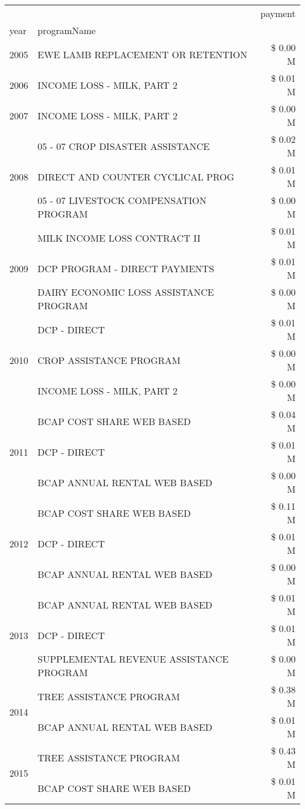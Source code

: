 \begin{tabular}{llr}
\toprule
 &  & payment \\
year & programName &  \\
\midrule
2005 & EWE LAMB REPLACEMENT OR RETENTION & \$ 0.00 M \\
\cline{1-3}
2006 & INCOME LOSS - MILK, PART 2 & \$ 0.01 M \\
\cline{1-3}
2007 & INCOME LOSS - MILK, PART 2 & \$ 0.00 M \\
\cline{1-3}
\multirow[t]{3}{*}{2008} & 05 - 07 CROP DISASTER ASSISTANCE & \$ 0.02 M \\
 & DIRECT AND COUNTER CYCLICAL PROG & \$ 0.01 M \\
 & 05 - 07 LIVESTOCK COMPENSATION PROGRAM & \$ 0.00 M \\
\cline{1-3}
\multirow[t]{3}{*}{2009} & MILK INCOME LOSS CONTRACT II & \$ 0.01 M \\
 & DCP PROGRAM - DIRECT PAYMENTS & \$ 0.01 M \\
 & DAIRY ECONOMIC LOSS ASSISTANCE PROGRAM & \$ 0.00 M \\
\cline{1-3}
\multirow[t]{3}{*}{2010} & DCP - DIRECT & \$ 0.01 M \\
 & CROP ASSISTANCE PROGRAM & \$ 0.00 M \\
 & INCOME LOSS - MILK, PART 2 & \$ 0.00 M \\
\cline{1-3}
\multirow[t]{3}{*}{2011} & BCAP COST SHARE WEB BASED & \$ 0.04 M \\
 & DCP - DIRECT & \$ 0.01 M \\
 & BCAP ANNUAL RENTAL WEB BASED & \$ 0.00 M \\
\cline{1-3}
\multirow[t]{3}{*}{2012} & BCAP COST SHARE WEB BASED & \$ 0.11 M \\
 & DCP - DIRECT & \$ 0.01 M \\
 & BCAP ANNUAL RENTAL WEB BASED & \$ 0.00 M \\
\cline{1-3}
\multirow[t]{3}{*}{2013} & BCAP ANNUAL RENTAL WEB BASED & \$ 0.01 M \\
 & DCP - DIRECT & \$ 0.01 M \\
 & SUPPLEMENTAL REVENUE ASSISTANCE PROGRAM & \$ 0.00 M \\
\cline{1-3}
\multirow[t]{2}{*}{2014} & TREE ASSISTANCE PROGRAM & \$ 0.38 M \\
 & BCAP ANNUAL RENTAL WEB BASED & \$ 0.01 M \\
\cline{1-3}
\multirow[t]{3}{*}{2015} & TREE ASSISTANCE PROGRAM & \$ 0.43 M \\
 & BCAP COST SHARE WEB BASED & \$ 0.01 M \\

\end{tabular}
